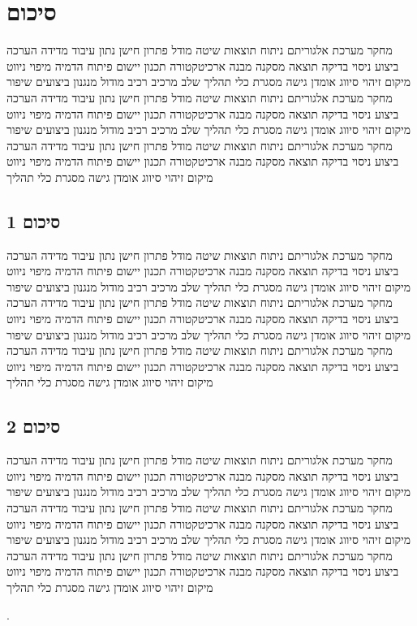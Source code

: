 \section{סיכום}
\label{sec:ch09}

מחקר מערכת אלגוריתם ניתוח תוצאות שיטה מודל פתרון חישן נתון עיבוד מדידה הערכה ביצוע ניסוי בדיקה תוצאה מסקנה מבנה ארכיטקטורה תכנון יישום פיתוח הדמיה מיפוי ניווט מיקום זיהוי סיווג אומדן גישה מסגרת כלי תהליך שלב מרכיב רכיב מודול מנגנון ביצועים שיפור מחקר מערכת אלגוריתם ניתוח תוצאות שיטה מודל פתרון חישן נתון עיבוד מדידה הערכה ביצוע ניסוי בדיקה תוצאה מסקנה מבנה ארכיטקטורה תכנון יישום פיתוח הדמיה מיפוי ניווט מיקום זיהוי סיווג אומדן גישה מסגרת כלי תהליך שלב מרכיב רכיב מודול מנגנון ביצועים שיפור מחקר מערכת אלגוריתם ניתוח תוצאות שיטה מודל פתרון חישן נתון עיבוד מדידה הערכה ביצוע ניסוי בדיקה תוצאה מסקנה מבנה ארכיטקטורה תכנון יישום פיתוח הדמיה מיפוי ניווט מיקום זיהוי סיווג אומדן גישה מסגרת כלי תהליך

\subsection{סיכום 1}
\label{sub:ch09_1}
מחקר מערכת אלגוריתם ניתוח תוצאות שיטה מודל פתרון חישן נתון עיבוד מדידה הערכה ביצוע ניסוי בדיקה תוצאה מסקנה מבנה ארכיטקטורה תכנון יישום פיתוח הדמיה מיפוי ניווט מיקום זיהוי סיווג אומדן גישה מסגרת כלי תהליך שלב מרכיב רכיב מודול מנגנון ביצועים שיפור מחקר מערכת אלגוריתם ניתוח תוצאות שיטה מודל פתרון חישן נתון עיבוד מדידה הערכה ביצוע ניסוי בדיקה תוצאה מסקנה מבנה ארכיטקטורה תכנון יישום פיתוח הדמיה מיפוי ניווט מיקום זיהוי סיווג אומדן גישה מסגרת כלי תהליך שלב מרכיב רכיב מודול מנגנון ביצועים שיפור מחקר מערכת אלגוריתם ניתוח תוצאות שיטה מודל פתרון חישן נתון עיבוד מדידה הערכה ביצוע ניסוי בדיקה תוצאה מסקנה מבנה ארכיטקטורה תכנון יישום פיתוח הדמיה מיפוי ניווט מיקום זיהוי סיווג אומדן גישה מסגרת כלי תהליך

\subsection{סיכום 2}
\label{sub:ch09_2}
מחקר מערכת אלגוריתם ניתוח תוצאות שיטה מודל פתרון חישן נתון עיבוד מדידה הערכה ביצוע ניסוי בדיקה תוצאה מסקנה מבנה ארכיטקטורה תכנון יישום פיתוח הדמיה מיפוי ניווט מיקום זיהוי סיווג אומדן גישה מסגרת כלי תהליך שלב מרכיב רכיב מודול מנגנון ביצועים שיפור מחקר מערכת אלגוריתם ניתוח תוצאות שיטה מודל פתרון חישן נתון עיבוד מדידה הערכה ביצוע ניסוי בדיקה תוצאה מסקנה מבנה ארכיטקטורה תכנון יישום פיתוח הדמיה מיפוי ניווט מיקום זיהוי סיווג אומדן גישה מסגרת כלי תהליך שלב מרכיב רכיב מודול מנגנון ביצועים שיפור מחקר מערכת אלגוריתם ניתוח תוצאות שיטה מודל פתרון חישן נתון עיבוד מדידה הערכה ביצוע ניסוי בדיקה תוצאה מסקנה מבנה ארכיטקטורה תכנון יישום פיתוח הדמיה מיפוי ניווט מיקום זיהוי סיווג אומדן גישה מסגרת כלי תהליך

 \cite{Thrun2005}.